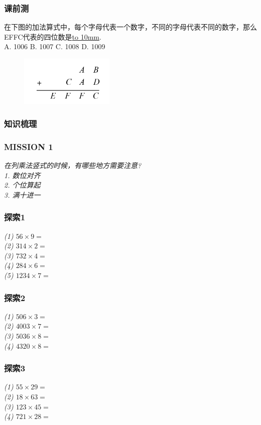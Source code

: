\begin{frame}
    \frametitle{课前测}
    \parbox{0.9\textwidth}{在下图的加法算式中，每个字母代表一个数字，不同的字母代表不同的数字，那么EFFC代表的四位数是\underline{\hbox to 10mm{}}.\\
    A. 1006\qquad 
    B. 1007\qquad 
    C. 1008\qquad
    D. 1009}
    \begin{figure}[H] 
        \centering
        \includegraphics[width=0.4\textwidth]{./pics/Chapter_4/keqian3.png}
    \end{figure}
\end{frame}

\begin{frame}
    \frametitle{知识梳理}
\end{frame}

\begin{frame}
    \frametitle{MISSION 1}
    \textit{在列乘法竖式的时候，有哪些地方需要注意?\\}
    \textit{1. 数位对齐\\
        2. 个位算起\\
        3. 满十进一}
\end{frame}

\begin{frame}
    \frametitle{探索1}
    \textit{(1) $56\times 9 = $\\
        (2) $314\times 2 = $\\
        (3) $732\times 4 = $\\
        (4) $284\times 6 = $\\
        (5) $1234\times 7 = $\\}
\end{frame}

\begin{frame}
    \frametitle{探索2}
    \textit{(1) $506\times 3 = $\\
        (2) $4003\times 7 = $\\
        (3) $5036\times 8 = $\\
        (4) $4320\times 8 = $}
\end{frame}

\begin{frame}
    \frametitle{探索3}
    \textit{(1) $55\times 29 = $\\
        (2) $18\times 63 = $\\
        (3) $123\times 45 = $\\
        (4) $721\times 28 = $}
\end{frame}

